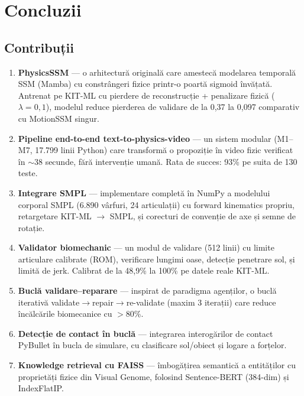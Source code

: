 \chapter{Concluzii}
\label{chap:concluzii}

\section{Contribuții}

\begin{enumerate}
    \item \textbf{PhysicsSSM} --- o arhitectură originală care amestecă modelarea temporală SSM (Mamba) cu constrângeri fizice printr-o poartă sigmoid învățată.  Antrenat pe KIT-ML cu pierdere de reconstrucție + penalizare fizică ($\lambda = 0{,}1$), modelul reduce pierderea de validare de la 0,37 la 0,097 comparativ cu MotionSSM singur.
    
    \item \textbf{Pipeline end-to-end text-to-physics-video} --- un sistem modular (M1--M7, 17.799 linii Python) care transformă o propoziție în video fizic verificat în $\sim$38 secunde, fără intervenție umană.  Rata de succes: 93\% pe suita de 130 teste.
    
    \item \textbf{Integrare SMPL} --- implementare completă în NumPy a modelului corporal SMPL (6.890 vârfuri, 24 articulații) cu forward kinematics propriu, retargetare KIT-ML $\rightarrow$ SMPL, și corecturi de convenție de axe și semne de rotație.
    
    \item \textbf{Validator biomechanic} --- un modul de validare (512 linii) cu limite articulare calibrate (ROM), verificare lungimi oase, detecție penetrare sol, și limită de jerk.  Calibrat de la 48,9\% la 100\% pe datele reale KIT-ML.
    
    \item \textbf{Buclă validare--reparare} --- inspirat de paradigma agenților, o buclă iterativă validate$\rightarrow$repair$\rightarrow$re-validate (maxim 3 iterații) care reduce încălcările biomecanice cu $>$80\%.
    
    \item \textbf{Detecție de contact în buclă} --- integrarea interogărilor de contact PyBullet în bucla de simulare, cu clasificare sol/obiect și logare a forțelor.
    
    \item \textbf{Knowledge retrieval cu FAISS} --- îmbogățirea semantică a entităților cu proprietăți fizice din Visual Genome, folosind Sentence-BERT (384-dim) și IndexFlatIP.
\end{enumerate}

